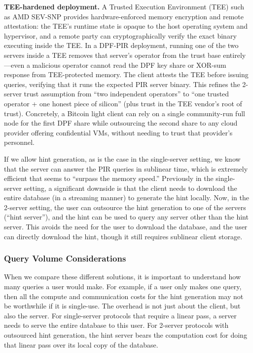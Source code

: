 \textbf{TEE-hardened deployment.} A Trusted Execution Environment (TEE) such as AMD SEV-SNP provides hardware-enforced memory encryption and remote attestation: the TEE's runtime state is opaque to the host operating system and hypervisor, and a remote party can cryptographically verify the exact binary executing inside the TEE. In a DPF-PIR deployment, running one of the two servers inside a TEE removes that server's operator from the trust base entirely---even a malicious operator cannot read the DPF key share or XOR-sum response from TEE-protected memory. The client attests the TEE before issuing queries, verifying that it runs the expected PIR server binary. This refines the 2-server trust assumption from ``two independent operators'' to ``one trusted operator + one honest piece of silicon'' (plus trust in the TEE vendor's root of trust). Concretely, a Bitcoin light client can rely on a single community-run full node for the first DPF share while outsourcing the second share to any cloud provider offering confidential VMs, without needing to trust that provider's personnel.

If we allow hint generation, as is the case in the single-server setting, we know that the server can answer the PIR queries in sublinear time, which is extremely efficient that seems to ``surpass the memory speed.'' Previously in the single-server setting, a significant downside is that the client needs to download the entire database (in a streaming manner) to generate the hint locally. Now, in the 2-server setting, the user can outsource the hint generation to one of the servers (``hint server''), and the hint can be used to query any server other than the hint server. This avoids the need for the user to download the database, and the user can directly download the hint, though it still requires sublinear client storage.

\subsubsection{Query Volume Considerations}

When we compare these different solutions, it is important to understand how many queries a user would make. For example, if a user only makes one query, then all the compute and communication costs for the hint generation may not be worthwhile if it is single-use. The overhead is not just about the client, but also the server. For single-server protocols that require a linear pass, a server needs to serve the entire database to this user. For 2-server protocols with outsourced hint generation, the hint server bears the computation cost for doing that linear pass over its local copy of the database.

